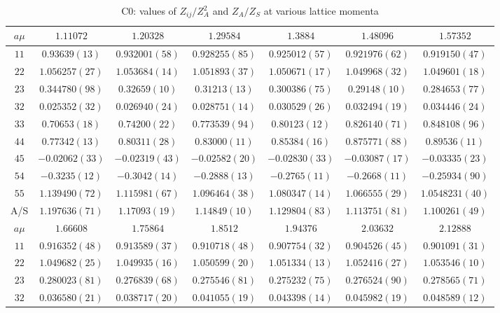 \begin{table}
\begin{center}
\caption{C0: values of $Z_{ij}/Z_A^2$ and $Z_A/Z_S$ at various lattice momenta}
\begin{tabular}{c|c c c c c c}
\hline
\hline
$a\mu$ & $1.11072$ & $1.20328$ & $1.29584$ & $1.3884$ & $1.48096$ & $1.57352$ \\
\hline
$11$ & $0.93639(13)$ & $0.932001(58)$ & $0.928255(85)$ & $0.925012(57)$ & $0.921976(62)$ & $0.919150(47)$ \\
$22$ & $1.056257(27)$ & $1.053684(14)$ & $1.051893(37)$ & $1.050671(17)$ & $1.049968(32)$ & $1.049601(18)$ \\
$23$ & $0.344780(98)$ & $0.32659(10)$ & $0.31213(13)$ & $0.300386(75)$ & $0.29148(10)$ & $0.284653(77)$ \\
$32$ & $0.025352(32)$ & $0.026940(24)$ & $0.028751(14)$ & $0.030529(26)$ & $0.032494(19)$ & $0.034446(24)$ \\
$33$ & $0.70653(18)$ & $0.74200(22)$ & $0.773539(94)$ & $0.80123(12)$ & $0.826140(71)$ & $0.848108(96)$ \\
$44$ & $0.77342(13)$ & $0.80311(28)$ & $0.83000(11)$ & $0.85384(16)$ & $0.875771(88)$ & $0.89536(11)$ \\
$45$ & $-0.02062(33)$ & $-0.02319(43)$ & $-0.02582(20)$ & $-0.02830(33)$ & $-0.03087(17)$ & $-0.03335(23)$ \\
$54$ & $-0.3235(12)$ & $-0.3042(14)$ & $-0.2888(13)$ & $-0.2765(11)$ & $-0.2668(11)$ & $-0.25934(90)$ \\
$55$ & $1.139490(72)$ & $1.115981(67)$ & $1.096464(38)$ & $1.080347(14)$ & $1.066555(29)$ & $1.0548231(40)$ \\
\hline
A/S & $1.197636(71)$ & $1.17093(19)$ & $1.14849(10)$ & $1.129804(83)$ & $1.113751(81)$ & $1.100261(49)$ \\
\hline
$a\mu$ & $1.66608$ & $1.75864$ & $1.8512$ & $1.94376$ & $2.03632$ & $2.12888$ \\
\hline
$11$ & $0.916352(48)$ & $0.913589(37)$ & $0.910718(48)$ & $0.907754(32)$ & $0.904526(45)$ & $0.901091(31)$ \\
$22$ & $1.049682(25)$ & $1.049935(16)$ & $1.050599(20)$ & $1.051334(13)$ & $1.052416(27)$ & $1.053546(10)$ \\
$23$ & $0.280023(81)$ & $0.276839(68)$ & $0.275546(81)$ & $0.275232(75)$ & $0.276524(90)$ & $0.278565(71)$ \\
$32$ & $0.036580(21)$ & $0.038717(20)$ & $0.041055(19)$ & $0.043398(14)$ & $0.045982(19)$ & $0.048589(12)$ \\

\end{tabular}
\end{center}
\end{table}
